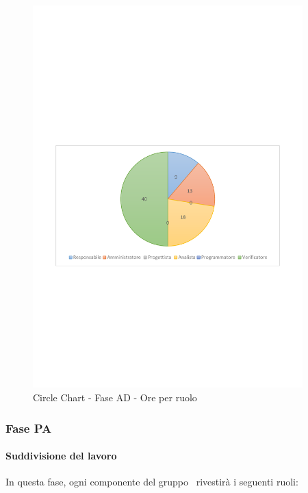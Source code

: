 \documentclass[../PianoProgetto.tex]{subfiles}
\begin{document}
	\begin{figure}[!h]
		\centering
		\includegraphics[width=0.93\textwidth , trim=2cm 9.5cm 2cm 11cm]{grafici/AD/AD-ore-ruolo}
			\caption{Circle Chart - Fase AD - Ore per ruolo}
		\label{fig:CircleChart-faseAD_ore_r}
	\end{figure}
\vfill	
\newpage	
	\subsubsection{Fase PA}
				\paragraph{Suddivisione del lavoro}
					In questa fase, ogni componente del gruppo \leaf\ rivestirà i seguenti ruoli:
	
\end{document}

